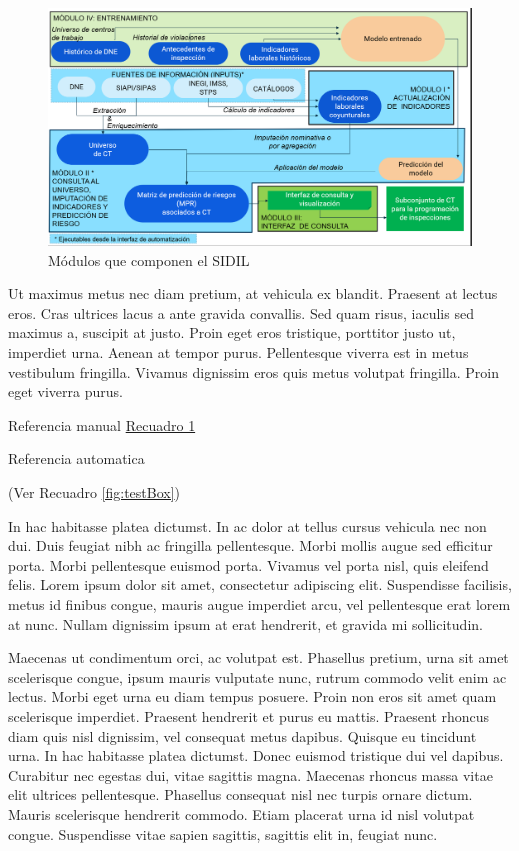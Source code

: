 \documentclass[
]{article}
\begin{document}
\begin{figure}
\includegraphics[width=17.74in]{images-1/02/pipeline_elaborado} \caption{Módulos que componen el SIDIL}\label{fig:modulosSIDasdaIL}
\end{figure}

Ut maximus metus nec diam pretium, at vehicula ex blandit. Praesent at lectus eros. Cras ultrices lacus a ante gravida convallis. Sed quam risus, iaculis sed maximus a, suscipit at justo. Proin eget eros tristique, porttitor justo ut, imperdiet urna. Aenean at tempor purus. Pellentesque viverra est in metus vestibulum fringilla. Vivamus dignissim eros quis metus volutpat fringilla. Proin eget viverra purus.

Referencia manual
\protect\hyperlink{fig:testBox}{Recuadro 1}

Referencia automatica

(Ver Recuadro \ref{fig:testBox})

In hac habitasse platea dictumst. In ac dolor at tellus cursus vehicula nec non dui. Duis feugiat nibh ac fringilla pellentesque. Morbi mollis augue sed efficitur porta. Morbi pellentesque euismod porta. Vivamus vel porta nisl, quis eleifend felis. Lorem ipsum dolor sit amet, consectetur adipiscing elit. Suspendisse facilisis, metus id finibus congue, mauris augue imperdiet arcu, vel pellentesque erat lorem at nunc. Nullam dignissim ipsum at erat hendrerit, et gravida mi sollicitudin.

Maecenas ut condimentum orci, ac volutpat est. Phasellus pretium, urna sit amet scelerisque congue, ipsum mauris vulputate nunc, rutrum commodo velit enim ac lectus. Morbi eget urna eu diam tempus posuere. Proin non eros sit amet quam scelerisque imperdiet. Praesent hendrerit et purus eu mattis. Praesent rhoncus diam quis nisl dignissim, vel consequat metus dapibus. Quisque eu tincidunt urna. In hac habitasse platea dictumst. Donec euismod tristique dui vel dapibus. Curabitur nec egestas dui, vitae sagittis magna. Maecenas rhoncus massa vitae elit ultrices pellentesque. Phasellus consequat nisl nec turpis ornare dictum. Mauris scelerisque hendrerit commodo. Etiam placerat urna id nisl volutpat congue. Suspendisse vitae sapien sagittis, sagittis elit in, feugiat nunc.
\end{document}

